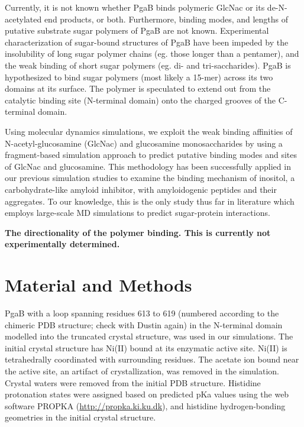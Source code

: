 Currently, it is not known whether PgaB binds polymeric GlcNac or its de-N-acetylated end products, or both. Furthermore, binding modes, and lengths of putative substrate sugar polymers of PgaB are not known. Experimental characterization of sugar-bound structures of PgaB have been impeded by the insolubility of long sugar polymer chains (eg. those longer than a pentamer), and the weak binding of short sugar polymers (eg. di- and tri-saccharides). PgaB is hypothesized to bind sugar polymers (most likely a 15-mer) across its two domains at its surface. The polymer is speculated to extend out from the catalytic binding site (N-terminal domain) onto the charged grooves of the C-terminal domain.

Using molecular dynamics simulations, we exploit the weak binding affinities of N-acetyl-glucosamine (GlcNac) and glucosamine monosaccharides by using a fragment-based simulation approach to predict putative binding modes and sites of GlcNac and glucosamine. This methodology has been successfully applied in our previous simulation studies to examine the binding mechanism of inositol, a carbohydrate-like amyloid inhibitor, with amyloidogenic peptides and their aggregates. To our knowledge, this is the only study thus far in literature which employs large-scale MD simulations to predict sugar-protein interactions.

\textbf{The directionality of the polymer binding.  This is currently not experimentally determined.} 

\section{Material and Methods}
PgaB with a loop spanning residues 613 to 619 (numbered according to the chimeric PDB structure; check with Dustin again) in the N-terminal domain modelled into the truncated crystal structure, was used in our simulations. The initial crystal structure has Ni(II) bound at its enzymatic active site. Ni(II) is tetrahedrally coordinated with surrounding residues.  The acetate ion bound near the active site, an artifact of crystallization, was removed in the simulation. Crystal waters were removed from the initial PDB structure. Histidine protonation states were assigned based on predicted pKa values using the web software PROPKA (\url{http://propka.ki.ku.dk}), and histidine hydrogen-bonding geometries in the initial crystal structure.

